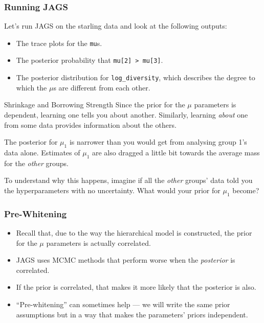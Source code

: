 \documentclass{beamer}
\begin{document}
\begin{frame}[fragile]
\frametitle{Running JAGS}
Let's run JAGS on the starling data and look at the following outputs:

\begin{itemize}
\item The trace plots for the \texttt{mu}s.\pause
\item The posterior probability that \texttt{mu[2] > mu[3]}.\pause
\item The posterior distribution for \texttt{log_diversity},
which describes the degree to which the $\mu$s are different from each other.
\end{itemize}


\end{frame}

\begin{frame}[fragile]{Shrinkage and Borrowing Strength}
Since the prior for the $\mu$ parameters is dependent, learning one
tells you about another. Similarly, learning {\em about} one from some data
provides information about the others.\pause

The posterior for
$\mu_1$ is narrower than you would get from analysing group 1's data alone.
Estimates of $\mu_1$ are also dragged a little bit towards the average mass
for the {\em other} groups.
\pause

To understand why this happens, imagine if all the {\em other} groups' data
told you the hyperparameters with no uncertainty. What would your
prior for $\mu_1$ become?
\end{frame}


\begin{frame}[fragile]
\frametitle{Pre-Whitening}

\begin{itemize}
\item Recall that, due to the way the hierarchical model is constructed,
the prior for the $\mu$ parameters is actually correlated.\pause
\item JAGS uses MCMC methods that perform worse when the {\em posterior}
is correlated.\pause
\item If the prior is correlated, that makes it more likely that the posterior
is also.\pause
\item ``Pre-whitening'' can sometimes help --- we will write the same prior
assumptions but in a way that makes the parameters' priors independent.
\end{itemize}


\end{frame}
\end{document}

